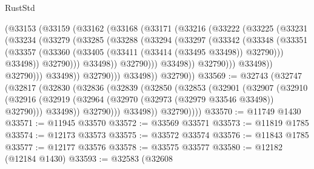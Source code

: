 \begin{lexlean}{RustStd}
\begin{coremodule}
                        (@33153
                          (@33159
                            (@33162
                              (@33168
                                (@33171
                                  (@33216
                                    (@33222
                                      (@33225
                                        (@33231
                                          (@33234
                                            (@33279
                                              (@33285
                                                (@33288
                                                  (@33294
                                                    (@33297
                                                      (@33342
                                                        (@33348
                                                          (@33351
                                                            (@33357
                                                              (@33360
                                                                (@33405
                                                                  (@33411
                                                                    (@33414 (@33495 @33498))
                                                                    @32790)))
                                                              @33498))
                                                          @32790)))
                                                    @33498))
                                                @32790)))
                                          @33498))
                                      @32790)))
                                @33498))
                            @32790)))
                      @33498))
                  @32790)))
            @33498))
        @32790))
@33569 := @32743
    (@32747
      (@32817
        (@32830
          (@32836
            (@32839
              (@32850
                (@32853
                  (@32901
                    (@32907
                      (@32910
                        (@32916
                          (@32919 (@32964 (@32970 (@32973 (@32979 @33546 @33498)) @32790)))
                          @33498))
                      @32790)))
                @33498))
            @32790))))
@33570 := @11749 @1430
@33571 := @11945 @33570
@33572 := @33569 @33571
@33573 := @11819 @1785
@33574 := @12173 @33573
@33575 := @33572 @33574
@33576 := @11843 @1785
@33577 := @12177 @33576
@33578 := @33575 @33577
@33580 := @12182 (@12184 @1430)
@33593 := @32583
    (@32608

\end{coremodule}
\end{lexlean}
